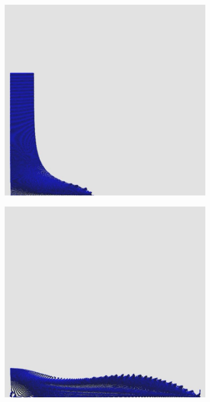 \documentclass[12pt,a4paper,dvipsnames]{article}
\begin{document}
\begin{figure}[!ht]
\begin{subfigure}[!h]{0.3\textwidth}
	\end{subfigure}
	\begin{subfigure}[!h]{0.3\textwidth} \centering
		\includegraphics[width=\textwidth]{DB/DB-002.jpg}
	\end{subfigure}
	\begin{subfigure}[!h]{0.3\textwidth} \centering
		\includegraphics[width=\textwidth]{DB/DB-003.jpg}

\end{subfigure}
\end{figure}
\end{document}
